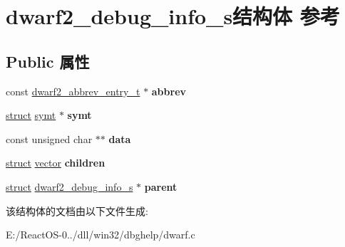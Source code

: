 \hypertarget{structdwarf2__debug__info__s}{}\section{dwarf2\+\_\+debug\+\_\+info\+\_\+s结构体 参考}
\label{structdwarf2__debug__info__s}
\subsection*{Public 属性}
\begin{DoxyCompactItemize}
\item 
\mbox{\label{structdwarf2__debug__info__s_a3dcd756e8fbddec2c428814cedbfe45a}} 
const \hyperlink{structdwarf2__abbrev__entry__s}{dwarf2\+\_\+abbrev\+\_\+entry\+\_\+t} $\ast$ {\bfseries abbrev}
\item 
\mbox{\label{structdwarf2__debug__info__s_a88eb3cce4a56269941ffb61bce66157a}} 
\hyperlink{interfacestruct}{struct} \hyperlink{structsymt}{symt} $\ast$ {\bfseries symt}
\item 
\mbox{\label{structdwarf2__debug__info__s_ab6a9839f1ac8bebd28c7d2dbd259626e}} 
const unsigned char $\ast$$\ast$ {\bfseries data}
\item 
\mbox{\label{structdwarf2__debug__info__s_a336aad093a29216bcf53a925d377bf3a}} 
\hyperlink{interfacestruct}{struct} \hyperlink{structvector}{vector} {\bfseries children}
\item 
\mbox{\label{structdwarf2__debug__info__s_a874e3498eca7d3b25903bc8d311575a0}} 
\hyperlink{interfacestruct}{struct} \hyperlink{structdwarf2__debug__info__s}{dwarf2\+\_\+debug\+\_\+info\+\_\+s} $\ast$ {\bfseries parent}
\end{DoxyCompactItemize}


该结构体的文档由以下文件生成\+:\begin{DoxyCompactItemize}
\item 
E\+:/\+React\+O\+S-\/0../dll/win32/dbghelp/dwarf.\+c\end{DoxyCompactItemize}
